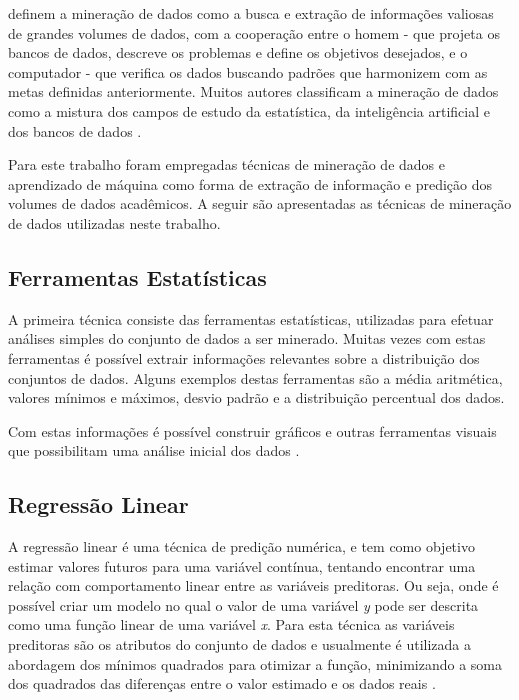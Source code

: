  definem a mineração de dados como a busca e extração de informações valiosas de grandes volumes de dados, com a cooperação entre o homem - que projeta os bancos de dados, descreve os problemas e define os objetivos desejados, e o computador - que verifica os dados buscando padrões que harmonizem com as metas definidas anteriormente. Muitos autores classificam a mineração de dados como a mistura dos campos de estudo da estatística, da inteligência artificial e dos bancos de dados \cite{Cortes2002}.

Para este trabalho foram empregadas técnicas de mineração de dados e aprendizado de máquina como forma de extração de informação e predição dos volumes de dados acadêmicos. A seguir são apresentadas as técnicas de mineração de dados utilizadas neste trabalho.

\subsection{Ferramentas Estatísticas}
    
A primeira técnica consiste das ferramentas estatísticas, utilizadas para efetuar análises simples do conjunto de dados a ser minerado. Muitas vezes com estas ferramentas é possível extrair informações relevantes sobre a distribuição dos conjuntos de dados. Alguns exemplos destas ferramentas são a média aritmética, valores mínimos e máximos, desvio padrão e a distribuição percentual dos dados.

Com estas informações é possível construir gráficos e outras ferramentas visuais que possibilitam uma análise inicial dos dados \cite{Adriaans1996}.

\subsection{Regressão Linear}
A regressão linear é uma técnica de predição numérica, e tem como objetivo estimar valores futuros para uma variável contínua, tentando encontrar uma relação com comportamento linear entre as variáveis preditoras.
Ou seja, onde é possível criar um modelo no qual o valor de uma variável \textit{y} pode ser descrita como uma função linear de uma variável \textit{x}.
Para esta técnica as variáveis preditoras são os atributos do conjunto de dados e usualmente é utilizada a abordagem dos mínimos quadrados para otimizar a função, minimizando a soma dos quadrados das diferenças entre o valor estimado e os dados reais \cite{Camilo2009}.
    
